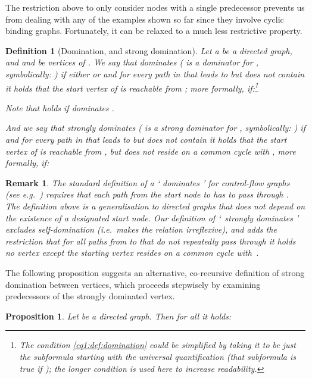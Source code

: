 \documentclass[submission,copyright,creativecommons]{eptcs}
\newtheorem{proposition}[theorem]{Proposition}
\newtheorem{definition}[theorem]{Definition}
\newtheorem{remark}[theorem]{Remark}
\renewcommand\;{\,}
\begin{document}
The restriction above to only consider nodes with a single predecessor prevents
us from dealing with any of the examples shown so far since they involve cyclic
binding graphs. Fortunately, it can be relaxed to a much less restrictive
property.



\begin{definition}[Domination, and strong domination]\normalfont\label{def:domination}
Let a  be a directed graph,
  and  and  be vertices of .
  We say that  \emph{dominates}  ( is a \emph{dominator} for , symbolically: ) if either  or
   and for every path  in  that leads to  but does not contain 
  it holds that the start vertex of  is reachable from ;
  more formally, if:\footnote{The condition \ref{eq1:def:domination} could be simplified by taking it to be just the
      subformula starting with the universal quantification
      (that subformula is true if ); the longer condition is used here to increase readability.}

Note that  holds if  dominates . 
  
  And we say that  \emph{strongly dominates}  
  ( is a \emph{strong dominator} for , symbolically: )  if  and for every path  in  that leads to  but does not contain 
  it holds that the start vertex  of  is reachable from , but does not reside on a common cycle with ,
  more formally, if:

\end{definition}

\begin{remark}\normalfont
The standard definition of a ` dominates ' for control-flow graphs (see e.g.~\cite{hech:ullm:1974}) 
  requires that each path from the start node to  has to pass through .
  The definition above is a generalisation to directed graphs that does not depend
  on the existence of a designated start node. 
Our definition of `~strongly dominates ' excludes self-domination (i.e.\ makes the relation irreflexive),
  and adds the restriction 
  that for all paths from  to  that do not repeatedly pass through 
  it holds no vertex except the starting vertex  resides on a common cycle with~.
\end{remark}


The following proposition suggests an alternative, co-recursive definition of strong domination
between vertices, which proceeds stepwisely by examining predecessors of the strongly dominated vertex.

\begin{proposition}\normalfont
Let  be a directed graph.
  Then for all  it holds:

\end{proposition}
\end{document}
